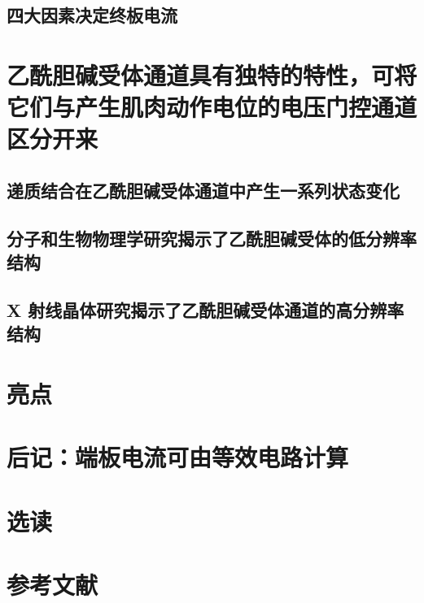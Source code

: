 \subsection{四大因素决定终板电流}

\section{乙酰胆碱受体通道具有独特的特性，可将它们与产生肌肉动作电位的电压门控通道区分开来}
\subsection{递质结合在乙酰胆碱受体通道中产生一系列状态变化}
\subsection{分子和生物物理学研究揭示了乙酰胆碱受体的低分辨率结构}
\subsection{X 射线晶体研究揭示了乙酰胆碱受体通道的高分辨率结构}

\section{亮点}

\section{后记：端板电流可由等效电路计算}

\section{选读}

\section{参考文献}